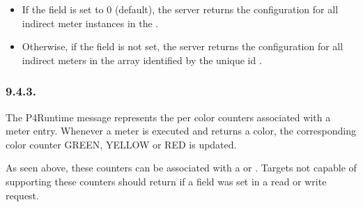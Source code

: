 \documentclass[11pt]{article}
\begin{document}
{%
\begin{itemize}%

\item{}
If the  field is set to 0 (default), the server returns the
configuration for all indirect meter instances in the .%

\item{}
Otherwise, if the  field is not set, the server returns the
configuration for all indirect meters in the array identified by the unique id
.%
\end{itemize}%

\subsubsection{9.4.3.\hspace*{0.5em}}\label{sec-metercounterdata}%

\noindent{}The  P4Runtime message represents the per color counters
associated with a meter entry. Whenever a meter is executed and returns
a color, the corresponding color counter GREEN, YELLOW or RED is updated.%

As seen above, these counters can be associated with a  or
. Targets not capable of supporting these counters should return
 if a  field was set in a read or write
request.%

}
\end{document}
